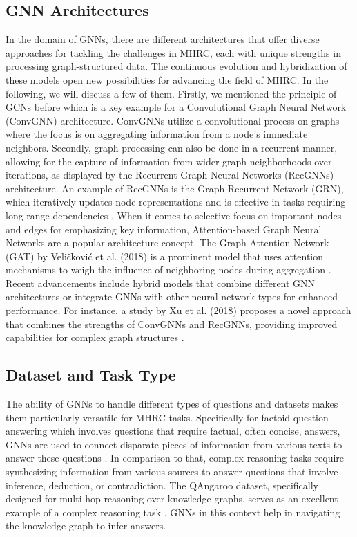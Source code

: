 \documentclass[sigplan,screen,nonacm]{acmart}
\begin{document}
\subsection{GNN Architectures}
In the domain of GNNs, there are different architectures that offer diverse approaches for tackling the challenges in MHRC, each with unique strengths
in processing graph-structured data. The continuous evolution and hybridization of these models open new possibilities for advancing the field of MHRC. In
the following, we will discuss a few of them. Firstly, we mentioned the principle of GCNs before which is a key example for a Convolutional Graph 
Neural Network (ConvGNN) architecture. ConvGNNs utilize a convolutional process on graphs where the focus is on aggregating information from a node's 
immediate neighbors. Secondly, graph processing can also be done in a recurrent manner, allowing for the capture of information from wider graph 
neighborhoods over iterations, as displayed by the Recurrent Graph Neural Networks (RecGNNs) architecture. An example of RecGNNs is the Graph Recurrent
Network (GRN), which iteratively updates node representations and is effective in tasks requiring long-range dependencies \cite{RN211}. When it comes to
selective focus on important nodes and edges for emphasizing key information, Attention-based Graph Neural Networks are a popular architecture concept. 
The Graph Attention Network (GAT) by Veličković et al. (2018) is a prominent model that uses attention mechanisms to weigh the influence of neighboring
nodes during aggregation \cite{RN7}. Recent advancements include hybrid models that combine different GNN architectures or integrate GNNs with other neural
network types for enhanced performance. For instance, a study by Xu et al. (2018) proposes a novel approach that combines the strengths of ConvGNNs 
and RecGNNs, providing improved capabilities for complex graph structures \cite{RN15}.

\subsection{Dataset and Task Type}
The ability of GNNs to handle different types of questions and datasets makes them particularly versatile for MHRC tasks. Specifically for factoid question
answering which involves questions that require factual, often concise, answers, GNNs are used to connect disparate pieces of information from various texts
to answer these questions \cite{RN116}. In comparison to that, complex reasoning tasks require synthesizing information from various sources to answer 
questions that involve inference, deduction, or contradiction. The QAngaroo dataset, specifically designed for multi-hop reasoning over knowledge graphs, 
serves as an excellent example of a complex reasoning task \cite{RN115}. GNNs in this context help in navigating the knowledge graph to infer answers.
\end{document}
